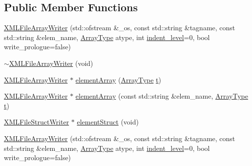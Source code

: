 \subsection*{Public Member Functions}
\begin{DoxyCompactItemize}
\item 
\mbox{\hyperlink{classXMLStructWriterAPI_1_1XMLFileArrayWriter_ab4591c76da7c7db03abe6a3e4cf0529a}{X\+M\+L\+File\+Array\+Writer}} (std\+::ofstream \&\+\_\+os, const std\+::string \&tagname, const std\+::string \&elem\+\_\+name, \mbox{\hyperlink{namespaceXMLStructWriterAPI_a2017208be87c77a32bdc19ea2f14d032}{Array\+Type}} atype, int \mbox{\hyperlink{classXMLStructWriterAPI_1_1XMLArrayWriterBase_ac27f8ee3bc74448bce22008dd40bf8da}{indent\+\_\+level}}=0, bool write\+\_\+prologue=false)
\item 
\mbox{\hyperlink{classXMLStructWriterAPI_1_1XMLFileArrayWriter_acfdbf7c2c12e6cbed700fb0fc48977e7}{$\sim$\+X\+M\+L\+File\+Array\+Writer}} (void)
\item 
\mbox{\hyperlink{classXMLStructWriterAPI_1_1XMLFileArrayWriter}{X\+M\+L\+File\+Array\+Writer}} $\ast$ \mbox{\hyperlink{classXMLStructWriterAPI_1_1XMLFileArrayWriter_afc24054ffb39df378f8aeb77e029bd59}{element\+Array}} (\mbox{\hyperlink{namespaceXMLStructWriterAPI_a2017208be87c77a32bdc19ea2f14d032}{Array\+Type}} \mbox{\hyperlink{hadron__timeslice_8cc_ac310d9181e916ba43604099aee272c71}{t}})
\item 
\mbox{\hyperlink{classXMLStructWriterAPI_1_1XMLFileArrayWriter}{X\+M\+L\+File\+Array\+Writer}} $\ast$ \mbox{\hyperlink{classXMLStructWriterAPI_1_1XMLFileArrayWriter_ad455da07ae5725cffdab8b056681ec2d}{element\+Array}} (const std\+::string \&elem\+\_\+name, \mbox{\hyperlink{namespaceXMLStructWriterAPI_a2017208be87c77a32bdc19ea2f14d032}{Array\+Type}} \mbox{\hyperlink{hadron__timeslice_8cc_ac310d9181e916ba43604099aee272c71}{t}})
\item 
\mbox{\hyperlink{classXMLStructWriterAPI_1_1XMLFileStructWriter}{X\+M\+L\+File\+Struct\+Writer}} $\ast$ \mbox{\hyperlink{classXMLStructWriterAPI_1_1XMLFileArrayWriter_aca9a5098cc4549e2001fc148ccb6329e}{element\+Struct}} (void)
\item 
\mbox{\hyperlink{classXMLStructWriterAPI_1_1XMLFileArrayWriter_ab4591c76da7c7db03abe6a3e4cf0529a}{X\+M\+L\+File\+Array\+Writer}} (std\+::ofstream \&\+\_\+os, const std\+::string \&tagname, const std\+::string \&elem\+\_\+name, \mbox{\hyperlink{namespaceXMLStructWriterAPI_a2017208be87c77a32bdc19ea2f14d032}{Array\+Type}} atype, int \mbox{\hyperlink{classXMLStructWriterAPI_1_1XMLArrayWriterBase_ac27f8ee3bc74448bce22008dd40bf8da}{indent\+\_\+level}}=0, bool write\+\_\+prologue=false)

\end{DoxyCompactItemize}
